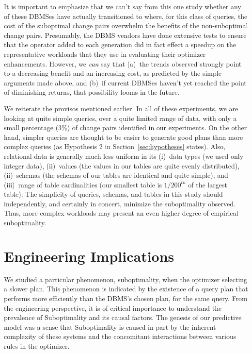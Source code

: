 \documentclass[prodmode,acmtods]{acmsmall}
\begin{document}
It is important to emphasize that we can't say from this one study
whether any of these DBMSes have actually
transitioned to where, for this class of queries, the cost of the
suboptimal change pairs overwhelm the benefits of the non-suboptimal change
pairs. Presumably, the DBMS vendors have done extensive tests to ensure
that the operator added to each generation did in fact effect a speedup on
the representative workloads that they use in evaluating their optimizer
enhancements. However, we {\em can} say that (a)~the trends observed
strongly point to a decreasing benefit and an increasing cost, as predicted
by the simple arguments made above, and (b)~if current DBMSes haven't yet
reached the point of diminishing returns, that possibility looms in the future.

We reiterate the provisos mentioned earlier. In all of these
experiments, we are looking at quite simple queries, over a quite limited
range of data, with only a small percentage (3\%) of change pairs
identified in our experiments. On the other hand, simpler queries
are thought to be easier to generate good plans than more complex queries
(as Hypothesis 2 in Section~\ref{sec:hypotheses} states). Also, relational
data is generally much less uniform in its (i)~data types (we used only
integer data), (ii)~values (the values in our tables are quite evenly
distributed), (ii)~schemas (the schemas of our tables are identical and
quite simple), and (iii)~range of table cardinalities (our smallest
table is $1/{200}^{th}$ of the largest table). The simplicity of queries, schemas,
and tables in this study should independently, and certainly in concert,
minimize the suboptimality observed. Thus, more complex workloads may
present an even higher degree of empirical suboptimality.

\section{Engineering Implications}\label{sec:engineering}
We studied a particular
phenomenon, suboptimality, when the \hbox{optimizer} selecting a slower
plan. This phenomenon is indicated by the existence of a query plan that performs more efficiently
than the DBMS's chosen plan, for the same query. From the engineering
\hbox{perspective}, it is of critical importance to understand the prevalence
of Suboptimality and its causal factors. The genesis of our predictive model
was a sense that Suboptimality is caused in part by the inherent complexity
of these systems and the concomitant interactions between various rules in the
optimizer.
\end{document}
